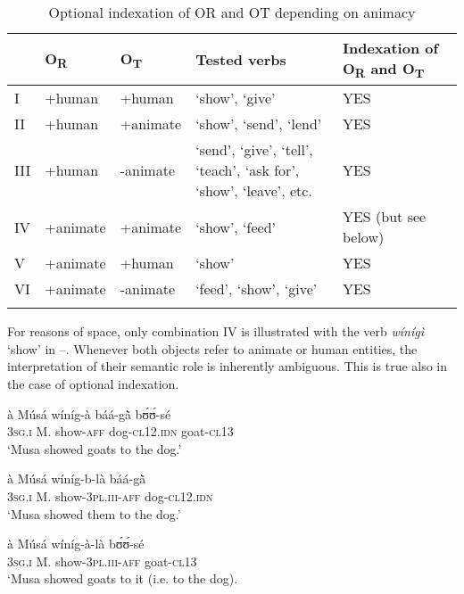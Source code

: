 \documentclass[output=paper]{langsci/langscibook}
\begin{document}
\begin{table}
\begin{tabularx}{\textwidth}{lll>{\raggedright\arraybackslash}Xl} 
\lsptoprule & {O}{\textsubscript{R}} & {O}{\textsubscript{T}} & {Tested verbs} & {Indexation of O}{\textsubscript{R}}{ and O}{\textsubscript{T}}{} \\
\midrule
I & +human & +human & `show', `give' & YES\\
II & +human & +animate & `show', `send', `lend' & YES\\
III & +human & -animate & `send', `give', `tell', `teach', `ask for', `show', `leave', etc. & YES\\
IV & +animate & +animate & `show', `feed' & YES (but see below)\\
V & +animate & +human & `show' & YES\\
VI & +animate & -animate & `feed', `show', `give' & YES\\
\lspbottomrule
\end{tabularx}
\caption{Optional indexation of OR and OT depending on animacy}
\label{tab:3.pacchiarotti}

 \end{table}


For reasons of space, only combination IV is illustrated with the verb \textit{wínígì} `show' in --. Whenever both objects refer to animate or human entities, the interpretation of their semantic role is inherently ambiguous. This is true also in the case of optional indexation.

\ea
\label{ex:25.pacchiarotti}
\gll à    Músá  wíníg-à  báá-g\`{ã}    bʊ́ʊ́-sé \\
\textsc{3sg.i}    M.  show-\textsc{aff}  dog-\textsc{cl12.idn}  goat-\textsc{cl13}\\
\glt `Musa showed goats to the dog.'
\z

\ea
\label{ex:26.pacchiarotti}
\gll à    Músá  wíníg-b-là    báá-g\`{ã}\\
\textsc{3sg.i} M.  show-\textsc{3pl.iii-aff}  dog-\textsc{cl12.idn}\\
\glt `Musa showed them to the dog.'  
\z

\ea
\label{ex:27.pacchiarotti}
\gll à    Músá  wíníg-à-là    bʊ́ʊ́-sé\\
\textsc{3sg.i}    M.  show-\textsc{3pl.iii-aff}  goat-\textsc{cl13}\\
\glt `Musa showed goats to it (i.e. to the dog).
\z
\end{document}
